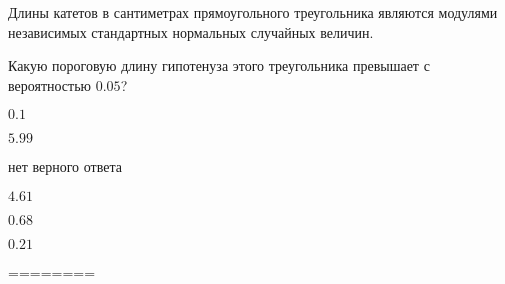 
\begin{question}
Длины катетов в сантиметрах прямоугольного треугольника являются
модулями независимых стандартных нормальных случайных величин.

Какую пороговую длину гипотенуза этого треугольника превышает с
вероятностью \(0.05\)?
\begin{answerlist}
  \item \(0.1\)
  \item \(5.99\)
  \item нет верного ответа
  \item \(4.61\)
  \item \(0.68\)
  \item \(0.21\)
\end{answerlist}
\end{question}

\begin{solution}
========
\end{solution}

